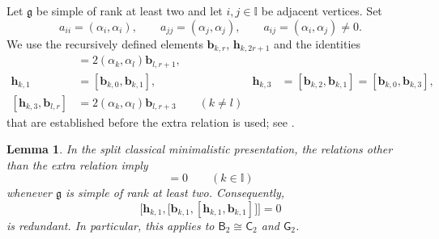 \documentclass[11pt,reqno]{amsart}
\numberwithin{equation}{section}
\newtheorem{lem}[thm]{Lemma}
\theoremstyle{definition}
\theoremstyle{remark}
\newcommand{\bb}{\mathbf{b}}
\newcommand{\bh}{\mathbf{h}}
\newcommand{\g}{\mathfrak{g}}
\newcommand{\I}{{\mathbb I}}
\begin{document}
Let $\g$ be simple of rank at least two and let $i,j\in\I$ be adjacent
vertices. Set
\[
 a_{ii}=(\alpha_i,\alpha_i),\qquad
 a_{jj}=(\alpha_j,\alpha_j),\qquad
 a_{ij}=(\alpha_i,\alpha_j)\ne0.
\]
We use the recursively defined elements $\bb_{k,r}$, $\bh_{k,2r+1}$
 and the identities
\begin{align}
 [\bh_{k,1},\bb_{l,r}]&=2(\alpha_k,\alpha_l)\bb_{l,r+1},
 \label{eq:split-mode-action}\\
 \bh_{k,1}&=[\bb_{k,0},\bb_{k,1}],
 &
 \bh_{k,3}&=[\bb_{k,2},\bb_{k,1}]
             =[\bb_{k,0},\bb_{k,3}],
 \label{eq:split-low-modes}\\
 [\bh_{k,3},\bb_{l,r}]&=2(\alpha_k,\alpha_l)\bb_{l,r+3}
 \qquad(k\ne l)
 \label{eq:split-h3-action}
\end{align}
that are established before the extra relation is used; see
\cite[(3.24)--(3.32)]{Lu26min}.

\begin{lem}\label{lem:split-extra-redundant-gr}
In the split classical minimalistic presentation, the relations other
than the extra relation imply
\begin{equation}
 [\bh_{k,1},\bh_{k,3}]=0
 \qquad(k\in\I)
 \label{eq:split-h1h3-derived}
\end{equation}
whenever $\g$ is simple of rank at least two. Consequently,
\begin{equation}
 \Big[\bh_{k,1},
   \big[\bb_{k,1},[\bh_{k,1},\bb_{k,1}]\big]
 \Big]=0
 \label{eq:split-extra-graded-derived}
\end{equation}
is redundant. In particular, this applies to
$\mathsf B_2\cong\mathsf C_2$ and $\mathsf G_2$.
\end{lem}
\end{document}

